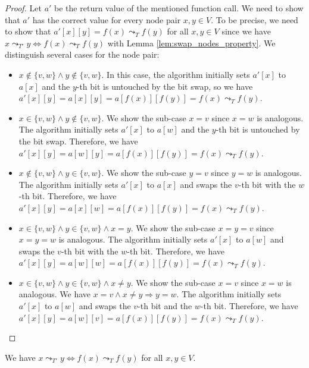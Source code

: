 \begin{proof}
    Let $a'$ be the return value of the mentioned function call. We need to show that $a'$ has the correct value for every node pair $x, y \in V$. To be precise, we need to show that $a'[x][y] = f(x) \leadsto_T f(y)$ for all $x, y \in V$ since we have $x \leadsto_{T'} y \Leftrightarrow f(x) \leadsto_T f(y)$ with Lemma \ref{lem:swap_nodes_property}. We distinguish several cases for the node pair:
    \begin{itemize}
        \item $x \notin \{v, w\} \wedge y \notin \{v, w\}$. In this case, the algorithm initially sets $a'[x]$ to $a[x]$ and the $y$-th bit is untouched by the bit swap, so we have $a'[x][y] = a[x][y] = a[f(x)][f(y)] = f(x) \leadsto_T f(y)$.
        
        \item $x \in \{v, w\} \wedge y \notin \{v, w\}$. We show the sub-case $x = v$ since $x = w$ is analogous. The algorithm initially sets $a'[x]$ to $a[w]$ and the $y$-th bit is untouched by the bit swap. Therefore, we have $a'[x][y] = a[w][y] = a[f(x)][f(y)] = f(x) \leadsto_T f(y)$.
        
        \item $x \notin \{v, w\} \wedge y \in \{v, w\}$. We show the sub-case $y = v$ since $y = w$ is analogous. The algorithm initially sets $a'[x]$ to $a[x]$ and swaps the $v$-th bit with the $w$-th bit. Therefore, we have $a'[x][y] = a[x][w] = a[f(x)][f(y)] = f(x) \leadsto_T f(y)$.
        
        \item $x \in \{v, w\} \wedge y \in \{v, w\} \wedge x = y$. We show the sub-case $x = y = v$ since $x = y = w$ is analogous. The algorithm initially sets $a'[x]$ to $a[w]$ and swaps the $v$-th bit with the $w$-th bit. Therefore, we have $a'[x][y] = a[w][w] = a[f(x)][f(y)] = f(x) \leadsto_T f(y)$.
        
        \item $x \in \{v, w\} \wedge y \in \{v, w\} \wedge x \neq y$. We show the sub-case $x = v$ since $x = w$ is analogous. We have $x = v \wedge x \neq y \Rightarrow y = w$. The algorithm initially sets $a'[x]$ to $a[w]$ and swaps the $v$-th bit and the $w$-th bit. Therefore, we have $a'[x][y] = a[w][v] = a[f(x)][f(y)] = f(x) \leadsto_T f(y)$.
    \end{itemize}
\end{proof}

\begin{lemma}
    \label{lem:swap_nodes_property}
    We have $x \leadsto_{T'} y \Leftrightarrow f(x) \leadsto_T f(y)$ for all $x, y \in V$.
\end{lemma}

